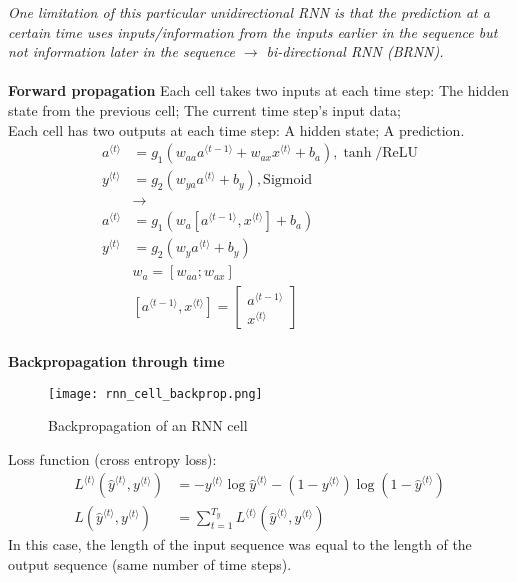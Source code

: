 \emph{\textcolor{Bittersweet}{One limitation of this particular unidirectional RNN is that the prediction at a certain time uses inputs/information from the inputs earlier in the sequence but not information later in the sequence $\rightarrow$ bi-directional RNN (BRNN).}}\\
\\
\textbf{Forward propagation}
Each cell takes two inputs at each time step: The hidden state from the previous cell; The current time step's input data;\\
Each cell has two outputs at each time step: A hidden state; A prediction.
\begin{align}
a^{\langle t \rangle} &= g_1(w_{aa}a^{\langle t-1 \rangle} + w_{ax}x^{\langle t \rangle} + b_a), \tanh/\text{ReLU}\\
y^{\langle t \rangle} &= g_2(w_{ya}a^{\langle t \rangle} + b_y), \text{Sigmoid}\\
&\rightarrow \nonumber\\
a^{\langle t \rangle} &= g_1(w_{a} [a^{\langle t-1 \rangle}, x^{\langle t \rangle}] + b_a)\\
y^{\langle t \rangle} &= g_2(w_{y}a^{\langle t \rangle} + b_y)\\
& w_a = [w_{aa}; w_{ax}] \nonumber \\
& [a^{\langle t-1 \rangle}, x^{\langle t \rangle}] = \begin{bmatrix}
    a^{\langle t-1 \rangle} \\ x^{\langle t \rangle}
    \end{bmatrix} \nonumber
\end{align}
~\\
\textbf{Backpropagation through time}\\
\begin{figure}[h]
    \centering
    \texttt{[image: rnn\_cell\_backprop.png]}
    \caption{Backpropagation of an RNN cell}
    \label{fig:rnn_cell_backprop}
\end{figure}
Loss function (cross entropy loss):
\begin{align}
L^{\langle t \rangle}(\hat{y}^{\langle t \rangle}, y^{\langle t \rangle}) &= - y^{\langle t \rangle}\log\hat{y}^{\langle t \rangle} - (1-y^{\langle t \rangle})\log(1-\hat{y}^{\langle t \rangle})\\
L(\hat{y}^{\langle t \rangle}, y^{\langle t \rangle}) &= \sum_{t=1}^{T_y} L^{\langle t \rangle}(\hat{y}^{\langle t \rangle}, y^{\langle t \rangle})
\end{align}
In this case, the length of the input sequence was equal to the length of the output sequence (same number of time steps).\\
